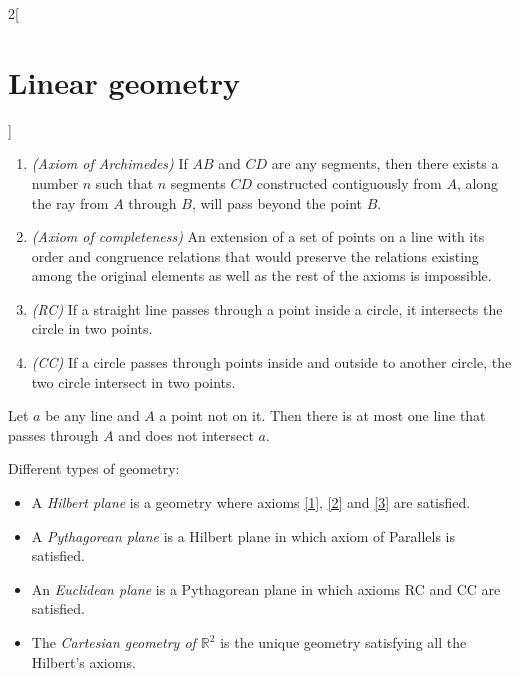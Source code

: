 \documentclass[class=article,10pt,crop=false]{standalone}
\begin{document}
\begin{multicols}{2}[\section{Linear geometry}]
\begin{axiom}
\begin{enumerate}
    \item \textit{(Axiom of Archimedes)} If $AB$ and $CD$ are any segments, then there exists a number $n$ such that $n$ segments $CD$ constructed contiguously from $A$, along the ray from $A$ through $B$, will pass beyond the point $B$.
    \item \textit{(Axiom of completeness)} An extension of a set of points on a line with its order and congruence relations that would preserve the relations existing among the original elements as well as the rest of the axioms is impossible.
    \item \textit{(RC)} If a straight line passes through a point inside a circle, it intersects the circle in two points.
    \item \textit{(CC)} If a circle passes through points inside and outside to another circle, the two circle intersect in two points.
\end{enumerate}
\end{axiom}
\begin{axiom}
\label{5}
Let $a$ be any line and $A$ a point not on it. Then there is at most one line that passes through $A$ and does not intersect $a$.
\end{axiom}
\begin{definition}
Different types of geometry: 
\begin{itemize}
    \item A \textit{Hilbert plane} is a geometry where axioms \ref{1}, \ref{2} and \ref{3} are satisfied.
    \item A \textit{Pythagorean plane} is a Hilbert plane in which axiom of Parallels is satisfied.
    \item An \textit{Euclidean plane} is a Pythagorean plane in which axioms RC and CC are satisfied.
    \item The \textit{Cartesian geometry of $\mathbb{R}^2$} is the unique geometry satisfying all the Hilbert's axioms.
\end{itemize}
\end{definition}

\end{multicols}
\end{document}
